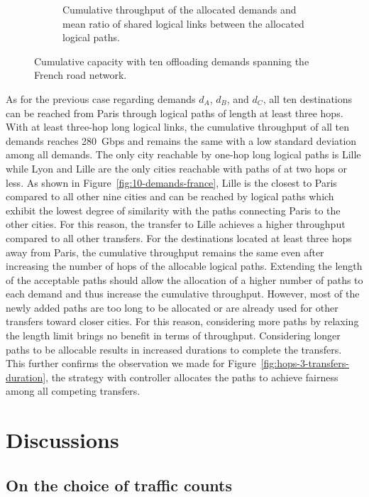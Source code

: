 \begin{figure}[!ht]
\begin{subfigure}[b]{0.45\textwidth}
        \caption{Cumulative throughput of the allocated demands and mean ratio of shared logical links between the allocated logical paths.}
        \label{fig:MMF-shared-throughput}
    \end{subfigure}%
    \caption{Cumulative capacity with ten offloading demands spanning the French road network.}
\end{figure}

As for the previous case regarding demands $d_A$, $d_B$, and $d_C$, all ten destinations can be reached from Paris through logical paths of length at least three hops. With at least three-hop long logical links, the cumulative throughput of all ten demands reaches 280~Gbps and remains the same with a low standard deviation among all demands. The only city reachable by one-hop long logical paths is Lille while Lyon and Lille are the only cities reachable with paths of at two hops or less. As shown in Figure~\ref{fig:10-demands-france}, Lille is the closest to Paris compared to all other nine cities and can be reached by logical paths which exhibit the lowest degree of similarity with the paths connecting Paris to the other cities. For this reason, the transfer to Lille achieves a higher throughput compared to all other transfers. For the destinations located at least three hops away from Paris, the cumulative throughput remains the same even after increasing the number of hops of the allocable logical paths. Extending the length of the acceptable paths should allow the allocation of a higher number of paths to each demand and thus increase the cumulative throughput. However, most of the newly added paths are too long to be allocated or are already used for other transfers toward closer cities. For this reason, considering more paths by relaxing the length limit brings no benefit in terms of throughput. Considering longer paths to be allocable results in increased durations to complete the transfers. This further confirms the observation we made for Figure~\ref{fig:hops-3-transfers-duration}, \ie the strategy with controller allocates the paths to achieve fairness among all competing transfers.

\section{Discussions}
\label{sec:discuss-haulage}

\subsection{On the choice of traffic counts}
\label{sec:choice-traffic-counts}


